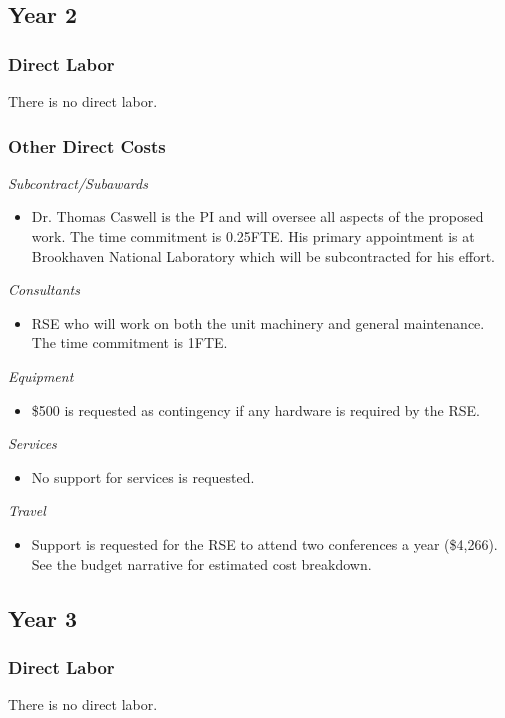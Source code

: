 \documentclass[12pt]{article}
\numberwithin{page}{section}
\begin{document}
\subsection{Year 2}
\subsubsection{Direct Labor}
There is no direct labor.
\subsubsection{Other Direct Costs}
\textit{Subcontract/Subawards}
\begin{itemize}
\item Dr. Thomas Caswell is the PI and will oversee all aspects of the
  proposed work.  The time commitment is 0.25FTE.  His primary
  appointment is at Brookhaven National Laboratory which will be
  subcontracted for his effort.
\end{itemize}
\textit{Consultants}
\begin{itemize}
\item RSE who will work on both the unit machinery and general
  maintenance.  The time commitment is 1FTE.
\end{itemize}
\textit{Equipment}
\begin{itemize}
\item \$500 is requested as contingency if any hardware is required by the RSE.
\end{itemize}
\textit{Services}
\begin{itemize}
\item No support for services is requested.
\end{itemize}
\textit{Travel}
\begin{itemize}
\item Support is requested for the RSE to attend two conferences a
  year (\$4,266).  See the budget narrative for estimated cost
  breakdown.
\end{itemize}
\subsection{Year 3}
\subsubsection{Direct Labor}
There is no direct labor.
\end{document}
